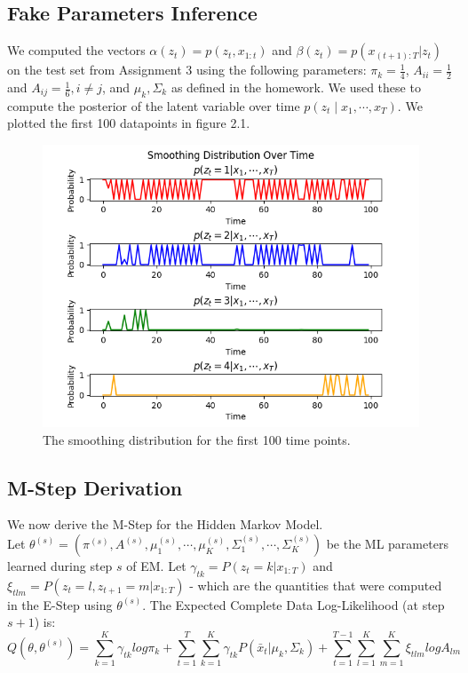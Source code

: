 \documentclass[paper=a4, fontsize=11pt]{scrartcl} %
\numberwithin{equation}{section} %
\numberwithin{figure}{section} %
\numberwithin{table}{section} %
\begin{document}
\subsection{Fake Parameters Inference}
We computed the vectors \(\alpha(z_t)=p(z_t,x_{1:t})\) and \(\beta(z_t)=p(x_{(t+1):T} | z_t)\) on the test set from Assignment 3 using the following parameters: \(\pi_k = \frac{1}{4}\), \(A_{ii}=\frac{1}{2}\) and \(A_{ij}=\frac{1}{6}, i\ne j\), and \(\mu_k, \Sigma_k\) as defined in the homework. 
We used these to compute the posterior of the latent variable over time \(p(z_t \mid x_1, \cdots, x_T)\). We plotted the first 100 datapoints in figure 2.1.

\begin{figure}
	\includegraphics[width=.9\linewidth]{smoothing_dist.png}
	\caption{The smoothing distribution for the first 100 time points.}
\end{figure}

\subsection{M-Step Derivation}
We now derive the M-Step for the Hidden Markov Model. \\
Let \(\theta^{(s)} = (\pi^{(s)}, A^{(s)}, \mu_1^{(s)}, \cdots, \mu_K^{(s)}, \Sigma_1^{(s)}, \cdots,\Sigma_K^{(s)})\) be the ML parameters learned during step \(s\) of EM. Let \(\gamma_{tk}=P(z_t=k|x_{1:T})\) and \(\xi_{tlm}=P(z_t=l,z_{t+1}=m|x_{1:T})\) - which are the quantities that were computed in the E-Step using \(\theta^{(s)}\).
The Expected Complete Data Log-Likelihood (at step \(s+1\)) is:
\begin{equation}
Q(\theta, \theta^{(s)}) = \sum_{k=1}^K \gamma_{tk}log\pi_k + \sum_{t=1}^T\sum_{k=1}^K \gamma_{tk}P(\bar{x}_t|\mu_{k}, \Sigma_{k}) + \sum_{t=1}^{T-1} \sum_{l=1}^K\sum_{m=1}^K\xi_{tlm}logA_{lm}
\end{equation}
\end{document}
